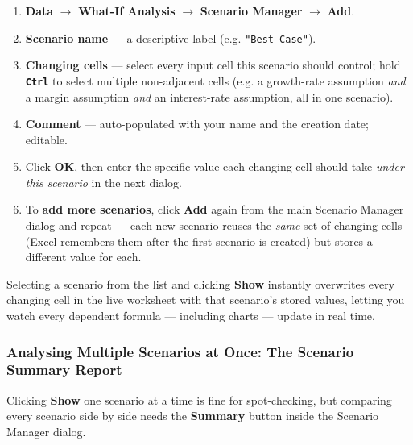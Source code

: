 \documentclass[11pt,a4paper]{article}
\newcommand{\key}[1]{\texttt{\colorbox{black!8}{\textbf{#1}}}}
\begin{document}
\begin{formulasyntax}
\begin{enumerate}
  \item \textbf{Data} $\rightarrow$ \textbf{What-If Analysis} $\rightarrow$ \textbf{Scenario Manager} $\rightarrow$ \textbf{Add}.
  \item \textbf{Scenario name} --- a descriptive label (e.g. \texttt{"Best Case"}).
  \item \textbf{Changing cells} --- select every input cell this scenario should control; hold \key{Ctrl} to select multiple non-adjacent cells (e.g. a growth-rate assumption \emph{and} a margin assumption \emph{and} an interest-rate assumption, all in one scenario).
  \item \textbf{Comment} --- auto-populated with your name and the creation date; editable.
  \item Click \textbf{OK}, then enter the specific value each changing cell should take \emph{under this scenario} in the next dialog.
  \item To \textbf{add more scenarios}, click \textbf{Add} again from the main Scenario Manager dialog and repeat --- each new scenario reuses the \emph{same} set of changing cells (Excel remembers them after the first scenario is created) but stores a different value for each.
\end{enumerate}
\end{formulasyntax}

Selecting a scenario from the list and clicking \textbf{Show} instantly overwrites every changing cell in the live worksheet with that scenario's stored values, letting you watch every dependent formula --- including charts --- update in real time.

\subsubsection{Analysing Multiple Scenarios at Once: The Scenario Summary Report}

Clicking \textbf{Show} one scenario at a time is fine for spot-checking, but comparing every scenario side by side needs the \textbf{Summary} button inside the Scenario Manager dialog.
\end{document}
